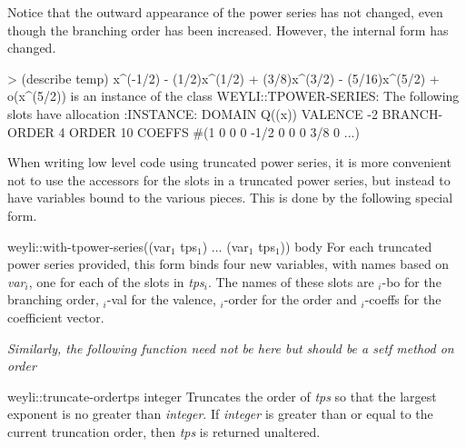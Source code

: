\noindent
Notice that the outward appearance of the power series has not
changed, even though the branching order has been increased.  However,
the internal form has changed.
\begin{code}
> (describe temp)
x^(-1/2) - (1/2)x^(1/2) + (3/8)x^(3/2) - (5/16)x^(5/2) + o(x^(5/2))
  is an instance of the class WEYLI::TPOWER-SERIES:
The following slots have allocation :INSTANCE:
DOMAIN          Q((x))
VALENCE         -2
BRANCH-ORDER    4
ORDER           10
COEFFS          #(1 0 0 0 -1/2 0 0 0 3/8 0 ...)
\end{code}

When writing low level code using truncated power series, it is more
convenient not to use the accessors for the slots in a truncated power
series, but instead to have variables bound to the various pieces.
This is done by the following special form. 

\begin{functiondef}{weyli::with-tpower-series}{((var$_1$ tps$_1$)
$\ldots$ (var$_1$ tps$_1$)) \body body}
For each truncated power series provided, this form binds four new
variables, with names based on {\em var}$_i$, one for each of the
slots in {\em tps}$_i$.  The names of these slots are 
{$_i$-bo} for the branching order,
{$_i$-val} for the valence, 
{$_i$-order} for the order and 
{$_i$-coeffs} for the coefficient vector.
\end{functiondef}

{\em Similarly, the following function need not be here but should be a
setf method on {\sf order}}

\begin{functiondef}{weyli::truncate-order}{tps integer}
Truncates the order of {\em tps} so that the largest exponent is no
greater than {\em integer}.  If {\em integer} is greater than or equal
to the current truncation order, then {\em tps} is returned unaltered.
\end{functiondef}

